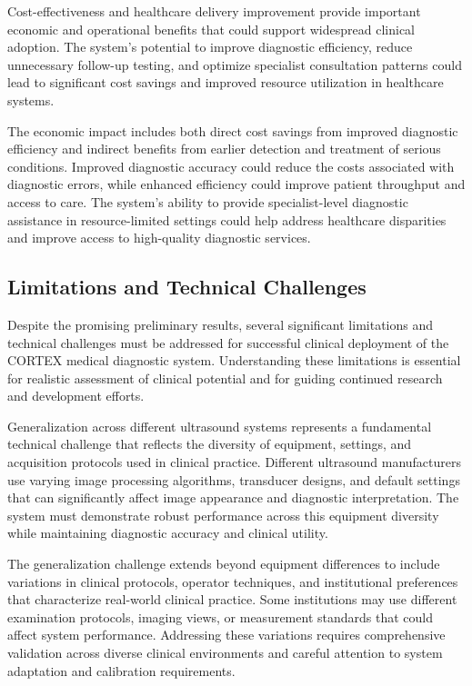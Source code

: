 Cost-effectiveness and healthcare delivery improvement provide important economic and operational benefits that could support widespread clinical adoption. The system's potential to improve diagnostic efficiency, reduce unnecessary follow-up testing, and optimize specialist consultation patterns could lead to significant cost savings and improved resource utilization in healthcare systems.

The economic impact includes both direct cost savings from improved diagnostic efficiency and indirect benefits from earlier detection and treatment of serious conditions. Improved diagnostic accuracy could reduce the costs associated with diagnostic errors, while enhanced efficiency could improve patient throughput and access to care. The system's ability to provide specialist-level diagnostic assistance in resource-limited settings could help address healthcare disparities and improve access to high-quality diagnostic services.

\subsection{Limitations and Technical Challenges}

Despite the promising preliminary results, several significant limitations and technical challenges must be addressed for successful clinical deployment of the CORTEX medical diagnostic system. Understanding these limitations is essential for realistic assessment of clinical potential and for guiding continued research and development efforts.

Generalization across different ultrasound systems represents a fundamental technical challenge that reflects the diversity of equipment, settings, and acquisition protocols used in clinical practice. Different ultrasound manufacturers use varying image processing algorithms, transducer designs, and default settings that can significantly affect image appearance and diagnostic interpretation. The system must demonstrate robust performance across this equipment diversity while maintaining diagnostic accuracy and clinical utility.

The generalization challenge extends beyond equipment differences to include variations in clinical protocols, operator techniques, and institutional preferences that characterize real-world clinical practice. Some institutions may use different examination protocols, imaging views, or measurement standards that could affect system performance. Addressing these variations requires comprehensive validation across diverse clinical environments and careful attention to system adaptation and calibration requirements.

